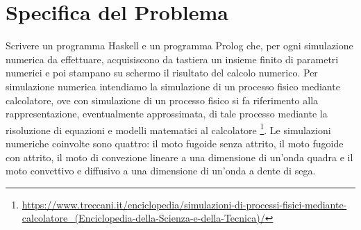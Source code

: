 \section{Specifica del Problema}

Scrivere un programma Haskell e un programma Prolog che, per ogni simulazione numerica da effettuare, acquisiscono da tastiera un insieme finito di parametri numerici e poi stampano su schermo il risultato del calcolo numerico. Per  simulazione numerica intendiamo la simulazione di un processo fisico mediante calcolatore, ove con simulazione di un processo fisico si fa riferimento alla rappresentazione, eventualmente approssimata, di tale processo mediante la risoluzione di equazioni e modelli matematici al calcolatore \footnote{\url{https://www.treccani.it/enciclopedia/simulazioni-di-processi-fisici-mediante-calcolatore_(Enciclopedia-della-Scienza-e-della-Tecnica)/}}. Le simulazioni numeriche coinvolte sono quattro: il moto fugoide senza attrito, il moto fugoide con attrito, il moto di convezione lineare a una dimensione di un'onda quadra e il moto convettivo e diffusivo a una dimensione di un'onda a dente di sega. 
